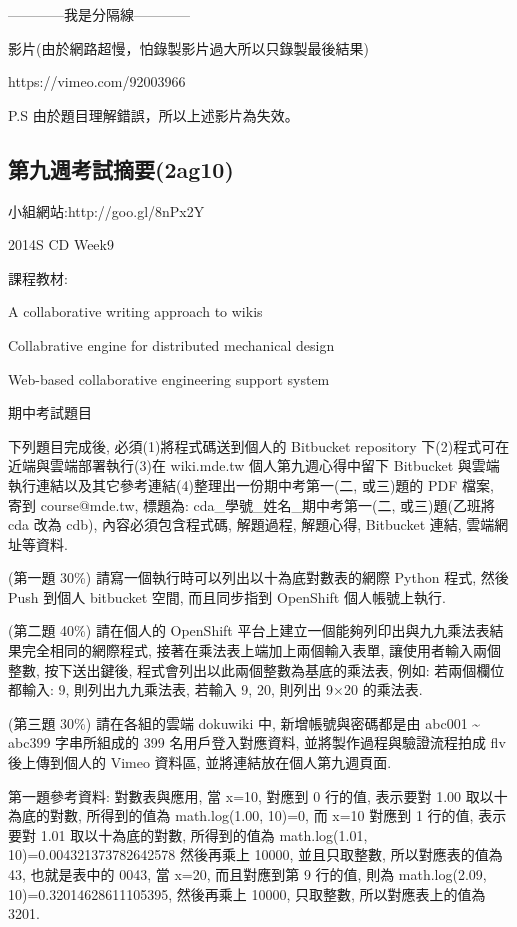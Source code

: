\documentclass[]{article}
\begin{document}
------------我是分隔線------------

影片(由於網路超慢，怕錄製影片過大所以只錄製最後結果)

https://vimeo.com/92003966

P.S 由於題目理解錯誤，所以上述影片為失效。

\subsection{第九週考試摘要(2ag10)}\label{ux7b2cux4e5dux9031ux8003ux8a66ux6458ux89812ag10}

小組網站:http://goo.gl/8nPx2Y

2014S CD Week9

課程教材:

A collaborative writing approach to wikis

Collabrative engine for distributed mechanical design

Web-based collaborative engineering support system

期中考試題目

下列題目完成後, 必須(1)將程式碼送到個人的 Bitbucket repository
下(2)程式可在近端與雲端部署執行(3)在 wiki.mde.tw 個人第九週心得中留下
Bitbucket 與雲端執行連結以及其它參考連結(4)整理出一份期中考第一(二,
或三)題的 PDF 檔案, 寄到 course@mde.tw, 標題為:
cda\_學號\_姓名\_期中考第一(二, 或三)題(乙班將 cda 改為 cdb),
內容必須包含程式碼, 解題過程, 解題心得, Bitbucket 連結, 雲端網址等資料.

(第一題 30\%) 請寫一個執行時可以列出以十為底對數表的網際 Python 程式,
然後 Push 到個人 bitbucket 空間, 而且同步指到 OpenShift 個人帳號上執行.

(第二題 40\%) 請在個人的 OpenShift
平台上建立一個能夠列印出與九九乘法表結果完全相同的網際程式,
接著在乘法表上端加上兩個輸入表單, 讓使用者輸入兩個整數, 按下送出鍵後,
程式會列出以此兩個整數為基底的乘法表, 例如: 若兩個欄位都輸入: 9,
則列出九九乘法表, 若輸入 9, 20, 則列出 9×20 的乘法表.

(第三題 30\%) 請在各組的雲端 dokuwiki 中, 新增帳號與密碼都是由 abc001
\textasciitilde{} abc399 字串所組成的 399 名用戶登入對應資料,
並將製作過程與驗證流程拍成 flv 後上傳到個人的 Vimeo 資料區,
並將連結放在個人第九週頁面.

第一題參考資料: 對數表與應用, 當 x=10, 對應到 0 行的值, 表示要對 1.00
取以十為底的對數, 所得到的值為 math.log(1.00, 10)=0, 而 x=10 對應到 1
行的值, 表示要對 1.01 取以十為底的對數, 所得到的值為 math.log(1.01,
10)=0.004321373782642578 然後再乘上 10000, 並且只取整數,
所以對應表的值為 43, 也就是表中的 0043, 當 x=20, 而且對應到第 9 行的值,
則為 math.log(2.09, 10)=0.32014628611105395, 然後再乘上 10000, 只取整數,
所以對應表上的值為 3201.
\end{document}
